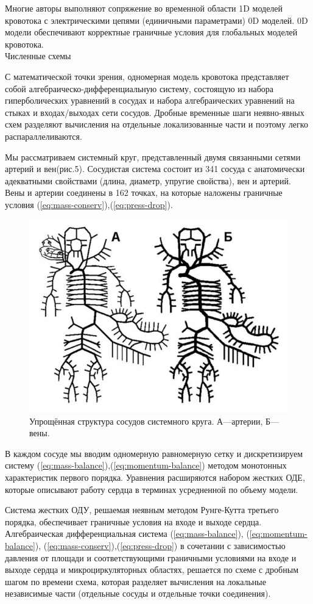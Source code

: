 \documentclass[a4paper, 14pt]{article}
\begin{document}
Многие авторы \cite{alastruey:2008} выполняют сопряжение во временной области 1D моделей кровотока с электрическими цепями (единичными параметрами) 0D моделей. 0D модели обеспечивают корректные граничные условия для глобальных моделей кровотока.
\\
Численные схемы

С математической точки зрения, одномерная модель кровотока представляет собой алгебраическо-дифференциальную систему, состоящую из набора гиперболических уравнений в сосудах и набора алгебраических уравнений на стыках и входах/выходах сети сосудов. Дробные временные шаги неявно-явных схем разделяют вычисления на отдельные локализованные части и поэтому легко распараллеливаются.

Мы рассматриваем системный круг, представленный двумя связанными сетями артерий и вен(рис.5). Сосудистая система состоит из 341 сосуда с анатомически адекватными свойствами (длина, диаметр, упругие свойства), вен и артерий. Вены и артерии соединены в 162 точках, на которые наложены граничные условия (\ref{eq:mass-conserv}),(\ref{eq:press-drop}). 

\begin{figure}[h]
\centering
\includegraphics[width=0.5\linewidth]{krug.png}
\caption{Упрощённая структура сосудов системного круга. А—артерии, Б—вены.}
\label{fig:mpr}
\end{figure}

В каждом сосуде мы вводим одномерную равномерную сетку и дискретизируем систему (\ref{eq:mass-balance}),(\ref{eq:momentum-balance}) методом монотонных характеристик первого порядка. Уравнения расширяются набором жестких ОДЕ, которые описывают работу сердца в терминах усредненной по объему модели.

Система жестких ОДУ, решаемая неявным методом Рунге-Кутта третьего порядка, обеспечивает граничные условия на входе и выходе сердца. Алгебраическая дифференциальная система (\ref{eq:mass-balance}), (\ref{eq:momentum-balance}), (\ref{eq:mass-conserv}),(\ref{eq:press-drop}) в сочетании с зависимостью давления от площади и соответствующими граничными условиями на входе и выходе сердца и микроциркуляторных областях, решается по схеме с дробным шагом по времени схема, которая разделяет вычисления на локальные независимые части (отдельные сосуды и отдельные точки соединения).
\end{document}
